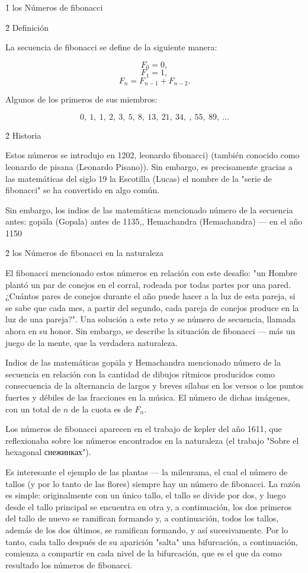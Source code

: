 \h1{ los Números de fibonacci }


\h2{ Definición }

La secuencia de fibonacci se define de la siguiente manera:

$$ F_0 = 0, $$
$$ F_1 = 1, $$
$$ F_n = F_{n-1} + F_{n-2}. $$

Algunos de los primeros de sus miembros:

$$ 0, ~ 1, ~ 1, ~ 2, ~ 3, ~ 5, ~ 8, ~ 13, ~ 21, ~ 34, ~ , ~ 55, ~ 89, ~ \ldots $$


\h2{ Historia }

Estos números se introdujo en 1202, leonardo fibonacci) (también conocido como leonardo de pisana (Leonardo Pisano)). Sin embargo, es precisamente gracias a las matemáticas del siglo 19 la Escotilla (Lucas) el nombre de la "serie de fibonacci" se ha convertido en algo común.

Sin embargo, los indios de las matemáticas mencionado número de la secuencia antes: gopāla (Gopala) antes de 1135,, Hemachandra (Hemachandra) --- en el año 1150


\h2{ los Números de fibonacci en la naturaleza }

El fibonacci mencionado estos números en relación con este desafío: "un Hombre plantó un par de conejos en el corral, rodeada por todas partes por una pared. ¿Cuántos pares de conejos durante el año puede hacer a la luz de esta pareja, si se sabe que cada mes, a partir del segundo, cada pareja de conejos produce en la luz de una pareja?". Una solución a este reto y se número de secuencia, llamada ahora en su honor. Sin embargo, se describe la situación de fibonacci --- más un juego de la mente, que la verdadera naturaleza.

Indios de las matemáticas gopāla y Hemachandra mencionado número de la secuencia en relación con la cantidad de dibujos rítmicos producidos como consecuencia de la alternancia de largos y breves sílabas en los versos o los puntos fuertes y débiles de las fracciones en la música. El número de dichas imágenes, con un total de $n$ de la cuota es de $F_n$.

Los números de fibonacci aparecen en el trabajo de kepler del año 1611, que reflexionaba sobre los números encontrados en la naturaleza (el trabajo "Sobre el hexagonal снежинках").

Es interesante el ejemplo de las plantas --- la milenrama, el cual el número de tallos (y por lo tanto de las flores) siempre hay un número de fibonacci. La razón es simple: originalmente con un único tallo, el tallo se divide por dos, y luego desde el tallo principal se encuentra en otra y, a continuación, los dos primeros del tallo de nuevo se ramifican formando y, a continuación, todos los tallos, además de los dos últimos, se ramifican formando, y así sucesivamente. Por lo tanto, cada tallo después de su aparición "salta" una bifurcación, a continuación, comienza a compartir en cada nivel de la bifurcación, que es el que da como resultado los números de fibonacci.

